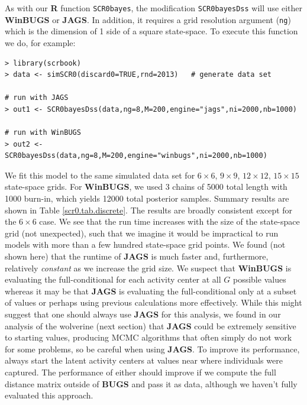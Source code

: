 As with our {\bf R} function \mbox{\tt SCR0bayes}, the modification
\mbox{\tt SCR0bayesDss} will use either {\bf WinBUGS} or {\bf
  JAGS}. In addition, it requires a grid resolution argument
(\mbox{\tt ng}) which is the dimension of 1 side of a square state-space.
To execute this function we do, for example:
{\small
\begin{verbatim}
> library(scrbook)
> data <- simSCR0(discard0=TRUE,rnd=2013)   # generate data set

# run with JAGS
> out1 <- SCR0bayesDss(data,ng=8,M=200,engine="jags",ni=2000,nb=1000)

# run with WinBUGS
> out2 <- SCR0bayesDss(data,ng=8,M=200,engine="winbugs",ni=2000,nb=1000)
\end{verbatim}
}
We fit this model to the same simulated data set for $6 \times 6$,
$9 \times 9$, $12 \times 12$, $15\times 15$ state-space grids.  For
{\bf WinBUGS}, we used 3 chains of 5000 total length with 1000
burn-in, which yields 12000 total posterior samples.  Summary results
are shown in Table \ref{scr0.tab.discrete}.  The results are broadly
consistent except for the $6\times 6$ case.  We see that the run time
increases with the size of the state-space grid (not unexpected), such
that we imagine it would be impractical to run models with more than a
few hundred state-space grid points.  We found (not shown here) that
the runtime of {\bf JAGS} is much faster and, furthermore, relatively
{\it constant} as we increase the grid size.  We suspect that {\bf
  WinBUGS} is evaluating the full-conditional for each activity center
at all $G$ possible values whereas it may be that {\bf JAGS} is
evaluating the full-conditional only at a subset of values or perhaps
using previous calculations more effectively.  While this might
suggest that one should always use {\bf JAGS} for this analysis, we
found in our analysis of the wolverine (next section) that {\bf JAGS}
could be extremely sensitive to starting values, producing MCMC
algorithms that often simply do not work for some problems, so be
careful when using {\bf JAGS}. To improve its performance, always
start the latent activity centers at values near where individuals
were captured.
The performance of either should improve if we compute the full
distance matrix outside of {\bf BUGS} and pass it as data, although we
haven't fully evaluated this approach.



